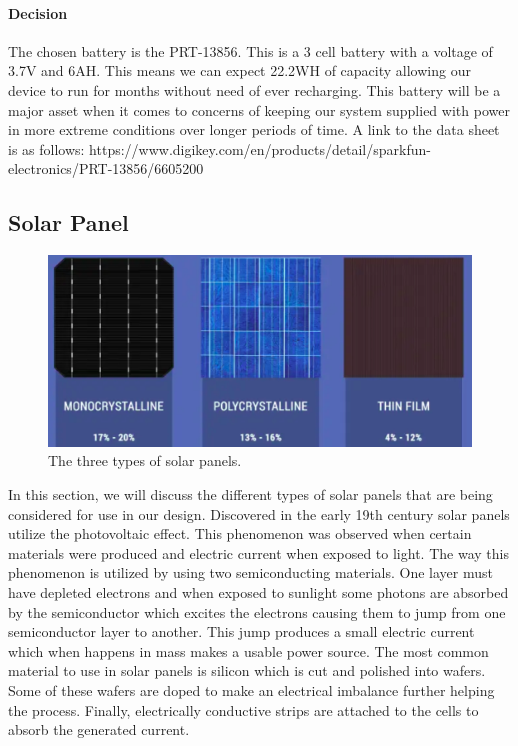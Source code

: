 \paragraph{Decision}
The chosen battery is the PRT-13856. This is a 3 cell battery with a voltage of 3.7V and 6AH. This means we can expect 22.2WH of capacity allowing our device to run for months without need of ever recharging. This battery will be a major asset when it comes to concerns of keeping our system supplied with power in more extreme conditions over longer periods of time. A link to the data sheet is as follows:
https://www.digikey.com/en/products/detail/sparkfun-electronics/PRT-13856/6605200

\subsection{Solar Panel}

\begin{figure}
    \centering
    \includegraphics[scale=0.4]{figures/solar panel overview.png}
    \caption{The three types of solar panels.}
    \label{solar-panel-overview} 
\end{figure}

In this section, we will discuss the different types of solar panels that are being considered for use in our design. Discovered in the early 19th century solar panels utilize the photovoltaic effect. This phenomenon was observed when certain materials were produced and electric current when exposed to light. The way this phenomenon is utilized by using two semiconducting materials. One layer must have depleted electrons and when exposed to sunlight some photons are absorbed by the semiconductor which excites the electrons causing them to jump from one semiconductor layer to another. This jump produces a small electric current which when happens in mass makes a usable power source. The most common material to use in solar panels is silicon which is cut and polished into wafers. Some of these wafers are doped to make an electrical imbalance further helping the process. Finally, electrically conductive strips are attached to the cells to absorb the generated current. 

